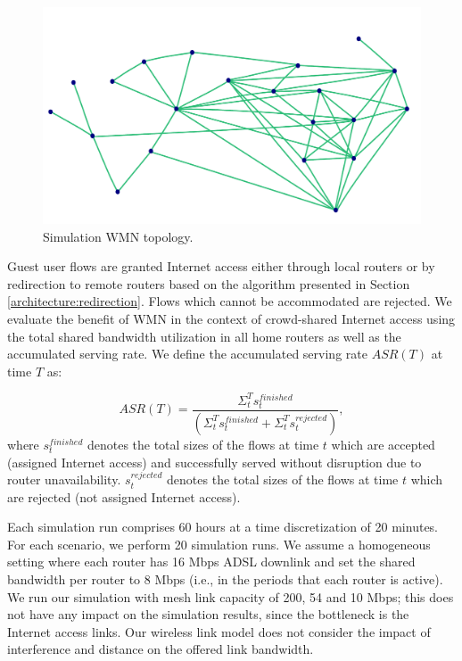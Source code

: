 \begin{figure}[t]
\begin{center}
\includegraphics[width=1\linewidth]{topology.pdf}
\caption{Simulation WMN topology.}
\label{fig:topology}
\end{center}
\end{figure}

Guest user flows are granted Internet access either through local routers or by redirection to remote routers based on the algorithm presented in Section \ref{architecture:redirection}. Flows which cannot be accommodated are rejected. We evaluate the benefit of WMN in the context of crowd-shared Internet access using the total shared bandwidth utilization in all home routers as well as the accumulated serving rate. We define the accumulated serving rate $ASR(T)$ at time $T$ as:

\begin{equation}\label{1}
ASR(T)= \frac{\Sigma^T_t s^{finished}_{t}}{(\Sigma^T_t s^{finished}_{t} + \Sigma^T_t s^{rejected}_{t})},
\end{equation}
%
where $s^{finished}_{t}$ denotes the total sizes of the flows at time $t$ which are accepted (assigned Internet access) and successfully served without disruption due to router unavailability. $s^{rejected}_{t}$ denotes the total sizes of the flows at time $t$ which are rejected (not assigned Internet access).

Each simulation run comprises 60 hours at a time discretization of 20 minutes. For each scenario, we perform 20 simulation runs. We assume a homogeneous setting where each router has 16 Mbps ADSL downlink and set the shared bandwidth per router to 8 Mbps (i.e., in the periods that each router is active). We run our simulation with mesh link capacity of 200, 54 and 10 Mbps; this does not have any impact on the simulation results, since the bottleneck is the Internet access links. Our wireless link model does not consider the impact of interference and distance on the offered link bandwidth.

